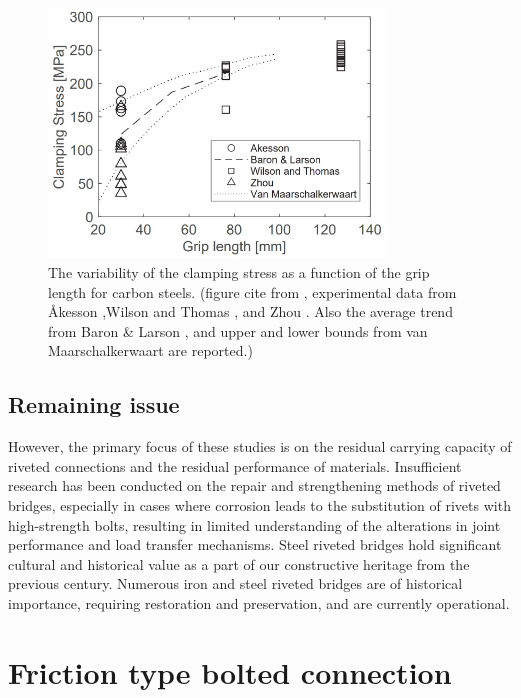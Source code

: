 \begin{figure}
    \centering
    \includegraphics[width=0.8\textwidth]{imgs/ch2/preload-rivet.pdf}
    \caption[The variability of the clamping stress as a function of the grip length for carbon steels.]{The variability of the clamping stress as a function of the grip length for carbon steels. (figure cite from \cite{Leonetti2020RivetBridges}, experimental data from Åkesson \cite{Akesson2010},Wilson and Thomas \cite{Wilson1938FatigueJoints}, and Zhou \cite{Zhou1994FatigueMembers}. Also the average trend from Baron \& Larson \cite{Baron1953TheJoints}, and upper and lower bounds from van Maarschalkerwaart \cite{VanMaarschalkerwaart1982FatigueJoints} are reported.)}
    \label{fig-preload-rivet}
\end{figure}


\subsection{Remaining issue}
However, the primary focus of these studies is on the residual carrying capacity of riveted connections and the residual performance of materials. Insufficient research has been conducted on the repair and strengthening methods of riveted bridges, especially in cases where corrosion leads to the substitution of rivets with high-strength bolts, resulting in limited understanding of the alterations in joint performance and load transfer mechanisms. Steel riveted bridges hold significant cultural and historical value as a part of our constructive heritage from the previous century. Numerous iron and steel riveted bridges are of historical importance, requiring restoration and preservation, and are currently operational.

\section{Friction type bolted connection}

